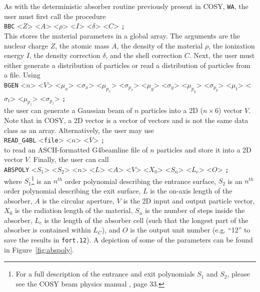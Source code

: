 \label{ssc:user_input}

As with the deterministic absorber routine previously present in COSY, \texttt{WA}, the user must first call the procedure\\
\texttt{BBC} <$Z$> <$A$> <$\rho$> <$I$> <$\delta$> <$C$> \texttt{;} \\
This stores the material parameters in a global array. The arguments are the nuclear charge $Z$, the atomic mass $A$, the density of the material $\rho$, the ionization energy $I$, the density correction $\delta$, and the shell correction $C$. Next, the user must either generate a distribution of particles or read a distribution of particles from a file. Using \\
\texttt{BGEN} <$n$> <$V$> <$\mu_x$> <$\sigma_x$> <$\mu_{p_x}$> <$\sigma_{p_x}$> <$\mu_y$> <$\sigma_y$> <$\mu_{p_y}$> <$\sigma_{p_y}$> <$\mu_t$> <$\sigma_t$> <$\mu_{p_z}$> <$\sigma_{p_z}$> \texttt{;}\\
the user can generate a Gaussian beam of $n$ particles into a 2D ($n\times 6$) vector $V$. Note that in COSY, a 2D vector is a vector of vectors and is not the same data class as an array. Alternatively, the user may use \\
\verb|READ_G4BL| <\texttt{file}> <$n$> <$V$> \texttt{;}\\
to read an ASCII-formatted G4beamline \cite{g4bl} file of $n$ particles and store it into a 2D vector $V$. Finally, the user can call\\
\texttt{ABSPOLY} <$S_1$> <$S_2$> <$n$> <$L$> <$A$> <$V$> <$X_0$> <$S_n$> <$L_c$> <$O$> \texttt{;}\\
where $S_1$\footnote{For a full description of the entrance and exit polynomials $S_1$ and $S_2$, please see the COSY beam physics manual \cite{cosy}, page 33.} is an $n^{th}$ order polynomial describing the entrance surface, $S_2$ is an $n^{th}$ order polynomial describing the exit surface, $L$ is the on-axis length of the absorber, $A$ is the circular aperture, $V$ is the 2D input and output particle vector, $X_0$ is the radiation length of the material, $S_n$ is the number of steps inside the absorber, $L_c$ is the length of the absorber cell (such that the longest part of the absorber is contained within $L_C$), and $O$ is the output unit number (e.g. ``12'' to save the results in \texttt{fort.12}). A depiction of some of the parameters can be found in Figure~\ref{fig:abspoly}.

